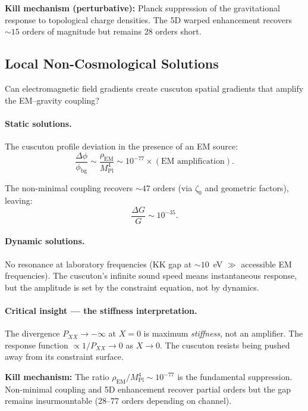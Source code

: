\textbf{Kill mechanism (perturbative):} Planck suppression of the gravitational response to topological charge densities. The 5D warped enhancement recovers ${\sim}15$ orders of magnitude but remains 28 orders short.

\subsection{Local Non-Cosmological Solutions}
\label{sec:3-local}

Can electromagnetic field gradients create cuscuton spatial gradients that amplify the EM--gravity coupling?

\paragraph{Static solutions.} The cuscuton profile deviation in the presence of an EM source:
\begin{equation}
  \frac{\Delta\phi}{\phi_{\mathrm{bg}}} \sim \frac{\rho_{\mathrm{EM}}}{M_{\mathrm{Pl}}^4}
    \sim 10^{-77} \times (\text{EM amplification}).
  \label{eq:3-25}
\end{equation}

The non-minimal coupling recovers ${\sim}47$ orders (via $\zeta_0$ and geometric factors), leaving:
\begin{equation}
  \frac{\Delta G}{G} \sim 10^{-35}.
  \label{eq:3-26}
\end{equation}

\paragraph{Dynamic solutions.} No resonance at laboratory frequencies (KK gap at ${\sim}10$~eV $\gg$ accessible EM frequencies). The cuscuton's infinite sound speed means instantaneous response, but the amplitude is set by the constraint equation, not by dynamics.

\paragraph{Critical insight --- the stiffness interpretation.} The divergence $P_{XX} \to -\infty$ at $X = 0$ is maximum \emph{stiffness}, not an amplifier. The response function $\propto 1/P_{XX} \to 0$ as $X \to 0$. The cuscuton resists being pushed away from its constraint surface.

\textbf{Kill mechanism:} The ratio $\rho_{\mathrm{EM}}/M_{\mathrm{Pl}}^4 \sim 10^{-77}$ is the fundamental suppression. Non-minimal coupling and 5D enhancement recover partial orders but the gap remains insurmountable (28--77 orders depending on channel).


